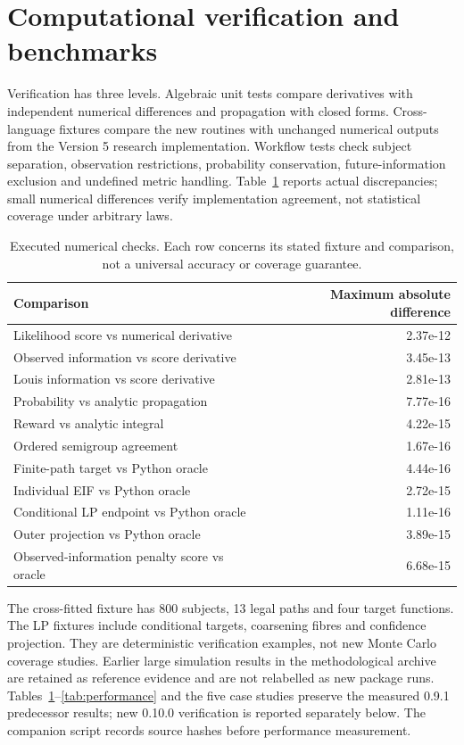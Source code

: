 \documentclass[article,nojss]{jss}
\begin{document}
\section{Computational verification and benchmarks}\label{sec:benchmarks}
Verification has three levels. Algebraic unit tests compare derivatives with independent numerical differences and propagation with closed forms. Cross-language fixtures compare the new routines with unchanged numerical outputs from the Version 5 research implementation. Workflow tests check subject separation, observation restrictions, probability conservation, future-information exclusion and undefined metric handling. Table~\ref{tab:parity} reports actual discrepancies; small numerical differences verify implementation agreement, not statistical coverage under arbitrary laws.
\begin{table}[tbp]
\centering\small
\begin{tabular}{lr}
\toprule
Comparison & Maximum absolute difference \\
\midrule
Likelihood score vs numerical derivative & 2.37e-12 \\
Observed information vs score derivative & 3.45e-13 \\
Louis information vs score derivative & 2.81e-13 \\
Probability vs analytic propagation & 7.77e-16 \\
Reward vs analytic integral & 4.22e-15 \\
Ordered semigroup agreement & 1.67e-16 \\
Finite-path target vs Python oracle & 4.44e-16 \\
Individual EIF vs Python oracle & 2.72e-15 \\
Conditional LP endpoint vs Python oracle & 1.11e-16 \\
Outer projection vs Python oracle & 3.89e-15 \\
Observed-information penalty score vs oracle & 6.68e-15 \\
\bottomrule
\end{tabular}
\caption{Executed numerical checks. Each row concerns its stated fixture and comparison, not a universal accuracy or coverage guarantee.}\label{tab:parity}
\end{table}


The cross-fitted fixture has 800 subjects, 13 legal paths and four target functions. The LP fixtures include conditional targets, coarsening fibres and confidence projection. They are deterministic verification examples, not new Monte Carlo coverage studies. Earlier large simulation results in the methodological archive are retained as reference evidence and are not relabelled as new package runs. Tables~\ref{tab:parity}--\ref{tab:performance} and the five case studies preserve the measured 0.9.1 predecessor results; new 0.10.0 verification is reported separately below. The companion script records source hashes before performance measurement.
\end{document}
